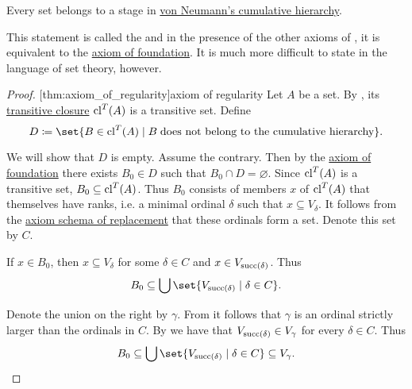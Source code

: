 \begin{theorem}\label{thm:axiom_of_regularity}
  Every set belongs to a stage in \hyperref[def:cumulative_hierarchy]{von Neumann's cumulative hierarchy}.

  This statement is called the  and in the presence of the other axioms of , it is equivalent to the \hyperref[def:zfc/foundation]{axiom of foundation}. It is much more difficult to state in the language of set theory, however.
\end{theorem}
\begin{proof}
  [thm:axiom_of_regularity]{axiom of regularity} Let \( A \) be a set. By , its \hyperref[def:transitive_closure_of_a_set]{transitive closure} \( \operatorname{cl}^T(A) \) is a transitive set. Define
  \begin{equation*}
    D \coloneqq \set{ B \in \cl^T(A) \given B \T{does not belong to the cumulative hierarchy} }.
  \end{equation*}

  We will show that \( D \) is empty. Assume the contrary. Then by the \hyperref[def:zfc/foundation]{axiom of foundation} there exists \( B_0 \in D \) such that \( B_0 \cap D = \varnothing \). Since \( \operatorname{cl}^T(A) \) is a transitive set, \( B_0 \subseteq \operatorname{cl}^T(A) \). Thus \( B_0 \) consists of members \( x \) of \( \operatorname{cl}^T(A) \) that themselves have ranks, i.e. a minimal ordinal \( \delta \) such that \( x \subseteq V_\delta \). It follows from the \hyperref[def:zfc/replacement]{axiom schema of replacement} that these ordinals form a set. Denote this set by \( C \).

  If \( x \in B_0 \), then \( x \subseteq V_\delta \) for some \( \delta \in C \) and \( x \in V_{\operatorname{succ}(\delta)} \). Thus
  \begin{equation*}
    B_0 \subseteq \bigcup\set{ V_{\op{succ}(\delta)} \given \delta \in C }.
  \end{equation*}

  Denote the union on the right by \( \gamma \). From  it follows that \( \gamma \) is an ordinal strictly larger than the ordinals in \( C \). By  we have that \( V_{\operatorname{succ}(\delta)} \in V_\gamma \) for every \( \delta \in C \). Thus
  \begin{equation*}
    B_0 \subseteq \bigcup\set{ V_{\op{succ}(\delta)} \given \delta \in C } \subseteq V_\gamma.
  \end{equation*}


\end{proof}
